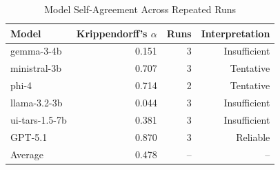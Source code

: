 \begin{table}[htbp]
\centering
\caption{Model Self-Agreement Across Repeated Runs}
\label{tab:self-agreement-krippendorff}
\begin{tabular}{lrrr}
\toprule
Model & Krippendorff's $\alpha$ & Runs & Interpretation \\
\midrule
gemma-3-4b & 0.151 & 3 & Insufficient \\
ministral-3b & 0.707 & 3 & Tentative \\
phi-4 & 0.714 & 2 & Tentative \\
llama-3.2-3b & 0.044 & 3 & Insufficient \\
ui-tars-1.5-7b & 0.381 & 3 & Insufficient \\
GPT-5.1 & 0.870 & 3 & Reliable \\
\midrule
Average & 0.478 & -- & -- \\
\bottomrule
\end{tabular}
\end{table}
